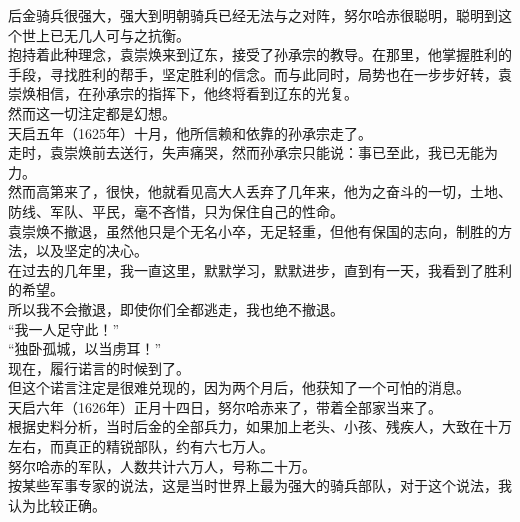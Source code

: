 \begin{multicols}{\theparacolNo}
后金骑兵很强大，强大到明朝骑兵已经无法与之对阵，努尔哈赤很聪明，聪明到这个世上已无几人可与之抗衡。\\

抱持着此种理念，袁崇焕来到辽东，接受了孙承宗的教导。在那里，他掌握胜利的手段，寻找胜利的帮手，坚定胜利的信念。而与此同时，局势也在一步步好转，袁崇焕相信，在孙承宗的指挥下，他终将看到辽东的光复。\\

然而这一切注定都是幻想。\\

天启五年（1625年）十月，他所信赖和依靠的孙承宗走了。\\

走时，袁崇焕前去送行，失声痛哭，然而孙承宗只能说：事已至此，我已无能为力。\\

然而高第来了，很快，他就看见高大人丢弃了几年来，他为之奋斗的一切，土地、防线、军队、平民，毫不吝惜，只为保住自己的性命。\\

袁崇焕不撤退，虽然他只是个无名小卒，无足轻重，但他有保国的志向，制胜的方法，以及坚定的决心。\\

在过去的几年里，我一直这里，默默学习，默默进步，直到有一天，我看到了胜利的希望。\\

所以我不会撤退，即使你们全都逃走，我也绝不撤退。\\

“我一人足守此！”\\

“独卧孤城，以当虏耳！”\\

现在，履行诺言的时候到了。\\

但这个诺言注定是很难兑现的，因为两个月后，他获知了一个可怕的消息。\\

天启六年（1626年）正月十四日，努尔哈赤来了，带着全部家当来了。\\

根据史料分析，当时后金的全部兵力，如果加上老头、小孩、残疾人，大致在十万左右，而真正的精锐部队，约有六七万人。\\

努尔哈赤的军队，人数共计六万人，号称二十万。\\

按某些军事专家的说法，这是当时世界上最为强大的骑兵部队，对于这个说法，我认为比较正确。\\


\end{multicols}
